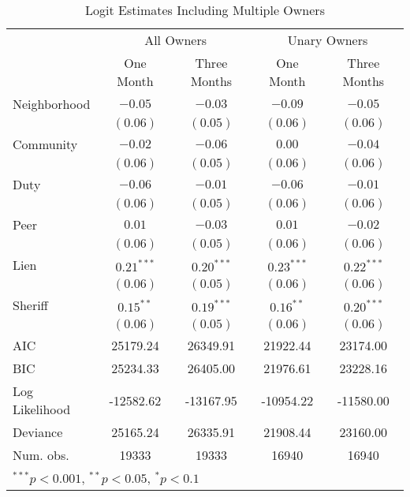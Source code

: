 \documentclass[12pt]{article}
\begin{document}
\begin{appendix}
\begin{table}
\caption{Logit Estimates Including Multiple Owners}\label{sh_logit_rob}
\begin{center}
\begin{tabular}{l c c c c }
\hline
 & \multicolumn{2}{c}{All Owners} & \multicolumn{2}{c}{Unary Owners} \\
 & One Month & Three Months & One Month & Three Months \\
\hline
Neighborhood   & $-0.05$      & $-0.03$      & $-0.09$      & $-0.05$      \\
               & $(0.06)$     & $(0.05)$     & $(0.06)$     & $(0.06)$     \\
Community      & $-0.02$      & $-0.06$      & $0.00$       & $-0.04$      \\
               & $(0.06)$     & $(0.05)$     & $(0.06)$     & $(0.06)$     \\
Duty           & $-0.06$      & $-0.01$      & $-0.06$      & $-0.01$      \\
               & $(0.06)$     & $(0.05)$     & $(0.06)$     & $(0.06)$     \\
Peer           & $0.01$       & $-0.03$      & $0.01$       & $-0.02$      \\
               & $(0.06)$     & $(0.05)$     & $(0.06)$     & $(0.06)$     \\
Lien           & $0.21^{***}$ & $0.20^{***}$ & $0.23^{***}$ & $0.22^{***}$ \\
               & $(0.06)$     & $(0.05)$     & $(0.06)$     & $(0.06)$     \\
Sheriff        & $0.15^{**}$  & $0.19^{***}$ & $0.16^{**}$  & $0.20^{***}$ \\
               & $(0.06)$     & $(0.05)$     & $(0.06)$     & $(0.06)$     \\
\hline
AIC            & 25179.24     & 26349.91     & 21922.44     & 23174.00     \\
BIC            & 25234.33     & 26405.00     & 21976.61     & 23228.16     \\
Log Likelihood & -12582.62    & -13167.95    & -10954.22    & -11580.00    \\
Deviance       & 25165.24     & 26335.91     & 21908.44     & 23160.00     \\
Num. obs.      & 19333        & 19333        & 16940        & 16940        \\
\hline
\multicolumn{5}{l}{\scriptsize{$^{***}p<0.001$, $^{**}p<0.05$, $^*p<0.1$}}
\end{tabular}
\end{center}
\end{table}



\end{appendix}
\end{document}
